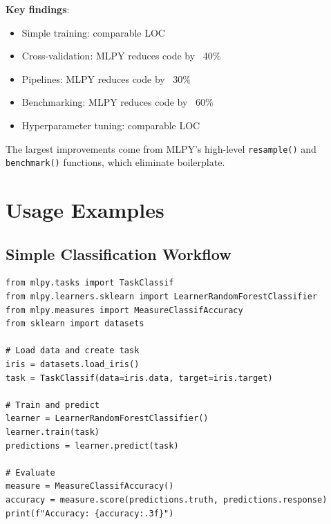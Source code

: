 \documentclass[twoside,11pt]{article}
\begin{document}

\textbf{Key findings}:
\begin{itemize}
  \item Simple training: comparable LOC
  \item Cross-validation: MLPY reduces code by ~40\%
  \item Pipelines: MLPY reduces code by ~30\%
  \item Benchmarking: MLPY reduces code by ~60\%
  \item Hyperparameter tuning: comparable LOC
\end{itemize}

The largest improvements come from MLPY's high-level \texttt{resample()} and
\texttt{benchmark()} functions, which eliminate boilerplate.





\section{Usage Examples}
\label{sec:examples}

\subsection{Simple Classification Workflow}

\begin{lstlisting}
from mlpy.tasks import TaskClassif
from mlpy.learners.sklearn import LearnerRandomForestClassifier
from mlpy.measures import MeasureClassifAccuracy
from sklearn import datasets

# Load data and create task
iris = datasets.load_iris()
task = TaskClassif(data=iris.data, target=iris.target)

# Train and predict
learner = LearnerRandomForestClassifier()
learner.train(task)
predictions = learner.predict(task)

# Evaluate
measure = MeasureClassifAccuracy()
accuracy = measure.score(predictions.truth, predictions.response)
print(f"Accuracy: {accuracy:.3f}")
\end{lstlisting}
\end{document}
